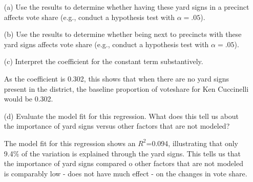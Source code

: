 \documentclass[12pt,letterpaper]{article}
\begin{document}
\vspace{.5cm}
\begin{enumerate}
	\item [(a)] Use the results to determine whether having these yard signs in a precinct affects vote share (e.g., conduct a hypothesis test with $\alpha = .05$).
		
	\newpage		
	\item [(b)]  Use the results to determine whether being
	next to precincts with these yard signs affects vote
	share (e.g., conduct a hypothesis test with $\alpha = .05$).
	
	\vspace{3cm}
	\item [(c)] Interpret the coefficient for the constant term substantively.
	
	As the coefficient is 0.302, this shows that when there are no yard signs present in the district, the baseline proportion of voteshare for Ken Cuccinelli would be 0.302. 
	
	
	\item [(d)] Evaluate the model fit for this regression.  What does this	tell us about the importance of yard signs versus other factors that are not modeled?
	
	The model fit for this regression shows an $R^2$=0.094, illustrating that only 9.4\% of the variation is explained through the yard signs. This tells us that the importance of yard signs compared o other factors that are not modeled is comparably low - does not have much effect - on the changes in vote share.   
	
\end{enumerate}  

\newpage
\end{document}

